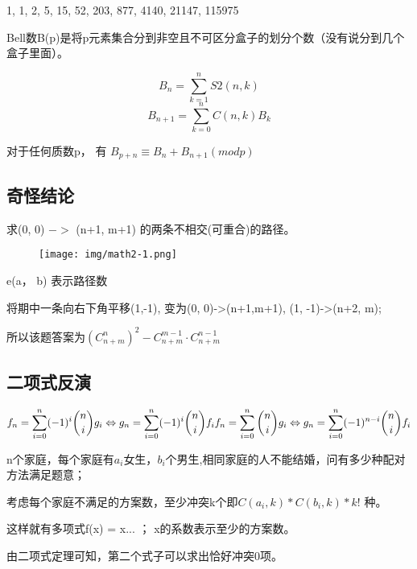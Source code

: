 1, 1, 2, 5, 15, 52, 203, 877, 4140, 21147, 115975

Bell数B(p)是将p元素集合分到非空且不可区分盒子的划分个数（没有说分到几个盒子里面）。

$$
B_n = \sum_{k=1}^nS2(n,k) 
$$
$$
B_{n+1} = \sum_{k=0}^n C(n, k)B_k 
$$

对于任何质数p， 有 $B_{p+n} \equiv B_n + B_{n+1} (mod p)$

\subsection{奇怪结论}

求(0, 0) $->$ (n+1, m+1) 的两条不相交(可重合)的路径。

\begin{figure}[h] %
	\texttt{[image: img/math2-1.png]}  %
	\caption{}  %
	\label{fig:mcmthesis-logo}   %
\end{figure}
	

e(a， b) 表示路径数

将期中一条向右下角平移(1,-1),  变为(0, 0)->(n+1,m+1), (1, -1)->(n+2, m); 

所以该题答案为$(C_{n+m}^n)^2-C_{n+m}^{m-1}·C_{n+m}^{n-1}$


\subsection{二项式反演}


$$
f_n = \sum_{i=0}^n (-1)^i {n \choose i} g_i \Leftrightarrow g_n = \sum_{i=0}^n (-1)^i {n \choose i} f_i \\
f_n = \sum_{i=0}^n {n \choose i} g_i \Leftrightarrow g_n = \sum_{i=0}^n (-1)^{n-i} {n \choose i} f_i
$$

n个家庭，每个家庭有$a_i$女生，$b_i$个男生,相同家庭的人不能结婚，问有多少种配对方法满足题意；

考虑每个家庭不满足的方案数，至少冲突k个即$C(a_i, k)*C(b_i, k)*k!​$ 种。

这样就有多项式f(x) = x... ； x的系数表示至少的方案数。

由二项式定理可知，第二个式子可以求出恰好冲突0项。

